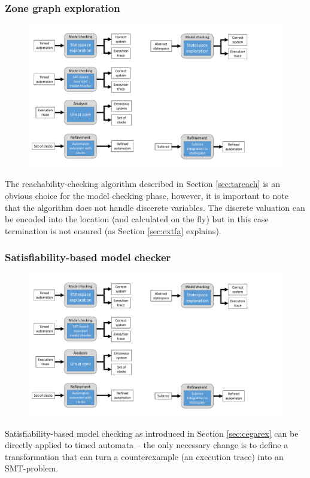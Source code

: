 \subsubsection{Zone graph exploration} 

\begin{figure} [h]
	\centering
	\includegraphics[width=.7\textwidth]{include/figures/modules_ta_mc}
\end{figure}

The reachability-checking algorithm described in Section \ref{sec:tareach} is an obvious choice for the model checking phase, however, it is important to note that the algorithm does not handle discerete variables. The discrete valuation can be encoded into the location (and calculated on the fly) but in this case termination is not ensured (as Section \ref{sec:extfa} explains).

\subsubsection{Satisfiability-based model checker}\label{sec:satmc}

\begin{figure}[h]
	\centering
	\includegraphics[width=.7\textwidth]{include/figures/modules_ta_mc_sat}
\end{figure}

Satisfiability-based model checking as introduced in Section \ref{sec:cegarex} can be directly applied to timed automata -- the only necessary change is to define a transformation that can turn a counterexample (an execution trace) into an SMT-problem.

